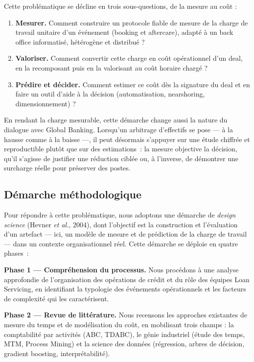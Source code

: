 Cette problématique se décline en trois sous-questions, de la mesure au coût :
\begin{enumerate}
  \item \textbf{Mesurer.} Comment construire un protocole fiable de mesure de la
  charge de travail unitaire d'un événement (booking et aftercare), adapté à un
  back office informatisé, hétérogène et distribué ?
  \item \textbf{Valoriser.} Comment convertir cette charge en coût opérationnel
  d'un deal, en la recomposant puis en la valorisant au coût horaire chargé ?
  \item \textbf{Prédire et décider.} Comment estimer ce coût dès la signature du
  deal et en faire un outil d'aide à la décision (automatisation, nearshoring,
  dimensionnement) ?
\end{enumerate}


En rendant la charge mesurable, cette démarche change aussi la nature du dialogue
avec Global Banking. Lorsqu'un arbitrage d'effectifs se pose --- à la hausse comme
à la baisse ---, il peut désormais s'appuyer sur une étude chiffrée et reproductible
plutôt que sur des estimations~: la mesure objective la décision, qu'il s'agisse de
justifier une réduction ciblée ou, à l'inverse, de démontrer une surcharge réelle
pour préserver des postes.


\subsection*{Démarche méthodologique}

Pour répondre à cette problématique, nous adoptons une démarche de \textit{design science} (Hevner \textit{et al.}, 2004), dont l'objectif est la construction et l'évaluation d'un artefact --- ici, un modèle de mesure et de prédiction de la charge de travail --- dans un contexte organisationnel réel. Cette démarche se déploie en quatre phases~:

\textbf{Phase 1 --- Compréhension du processus.} Nous procédons à une analyse approfondie de l'organisation des opérations de crédit et du rôle des équipes Loan Servicing, en identifiant la typologie des événements opérationnels et les facteurs de complexité qui les caractérisent.

\textbf{Phase 2 — Revue de littérature.} Nous recensons les approches
existantes de mesure du temps et de modélisation du coût, en mobilisant
trois champs : la comptabilité par activités (ABC, TDABC), le génie
industriel (étude des temps, MTM, Process Mining) et la science des données
(régression, arbres de décision, gradient boosting, interprétabilité).

